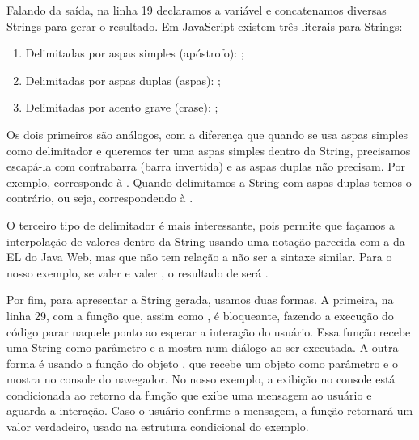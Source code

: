 Falando da saída, na linha 19 declaramos a variável  e concatenamos diversas Strings para gerar o resultado. Em JavaScript existem três literais para Strings:
  
\begin{enumerate}
    \item Delimitadas por aspas simples (apóstrofo): ;
    \item Delimitadas por aspas duplas (aspas): ;
    \item Delimitadas por acento grave (crase): ;
\end{enumerate}

Os dois primeiros são análogos, com a diferença que quando se usa aspas simples como delimitador e queremos ter uma aspas simples dentro da String, precisamos escapá-la com contrabarra (barra invertida) e as aspas duplas não precisam. Por exemplo,  corresponde à . Quando delimitamos a String com aspas duplas temos o contrário, ou seja,  correspondendo à .

O terceiro tipo de delimitador é mais interessante, pois permite que façamos a interpolação de valores dentro da String usando uma notação parecida com a da EL do Java Web, mas que não tem relação a não ser a sintaxe similar. Para o nosso exemplo, se  valer  e  valer , o resultado de  será .

Por fim, para apresentar a String gerada, usamos duas formas. A primeira, na linha 29, com a função  que, assim como , é bloqueante, fazendo a execução do código parar naquele ponto ao esperar a interação do usuário. Essa função recebe uma String como parâmetro e a mostra num diálogo ao ser executada. A outra forma é usando a função  do objeto , que recebe um objeto como parâmetro e o mostra no console do navegador. No nosso exemplo, a exibição no console está condicionada ao retorno da função  que exibe uma mensagem ao usuário e aguarda a interação. Caso o usuário confirme a mensagem, a função retornará um valor verdadeiro, usado na estrutura condicional  do exemplo.



